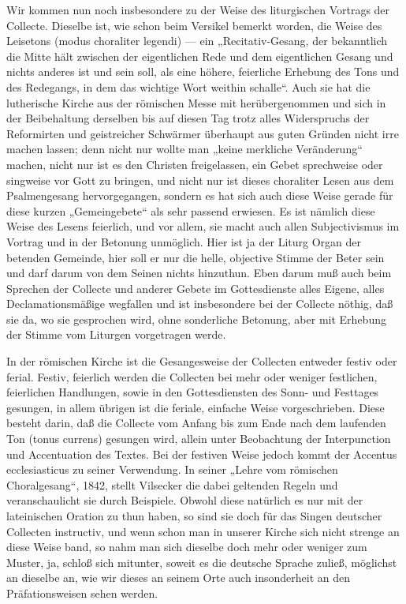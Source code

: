 Wir kommen nun noch insbesondere zu der Weise des liturgischen Vortrags der Collecte. Dieselbe ist, wie schon beim Versikel bemerkt worden, die Weise des Leisetons (modus choraliter legendi) — ein „Recitativ-Gesang, der bekanntlich die Mitte hält zwischen der eigentlichen Rede und dem eigentlichen Gesang und nichts anderes ist und sein soll, als eine höhere, feierliche Erhebung des Tons und des Redegangs, in dem das wichtige Wort weithin schalle“. Auch sie hat die lutherische Kirche aus der römischen Messe mit herübergenommen und sich in der Beibehaltung derselben bis auf diesen Tag trotz alles Widerspruchs der Reformirten und geistreicher Schwärmer überhaupt aus guten Gründen nicht irre machen lassen; denn nicht nur wollte man
„keine merkliche Veränderung“ machen, nicht nur ist es den Christen freigelassen, ein Gebet sprechweise oder singweise vor Gott zu bringen, und nicht nur ist dieses choraliter Lesen aus dem Psalmengesang hervorgegangen, sondern es hat sich auch diese Weise gerade für diese kurzen „Gemeingebete“ als sehr passend erwiesen. Es ist nämlich diese Weise des Lesens feierlich, und vor allem, sie macht auch allen Subjectivismus im Vortrag und in der Betonung unmöglich. Hier ist ja der Liturg Organ der betenden Gemeinde, hier soll er nur die helle, objective Stimme der Beter sein und darf darum von dem Seinen nichts hinzuthun. Eben darum muß auch beim Sprechen der Collecte und anderer Gebete im Gottesdienste alles Eigene, alles Declamationsmäßige wegfallen und ist insbesondere bei der Collecte nöthig, daß sie da, wo sie gesprochen wird, ohne sonderliche Betonung, aber mit Erhebung der Stimme vom Liturgen vorgetragen werde.

In der römischen Kirche ist die Gesangesweise der Collecten entweder festiv oder ferial. Festiv, feierlich werden die Collecten bei mehr oder weniger festlichen, feierlichen Handlungen, sowie in den Gottesdiensten des Sonn- und Festtages gesungen, in allem übrigen ist die feriale, einfache Weise vorgeschrieben. Diese besteht darin, daß die Collecte vom Anfang bis zum Ende nach dem laufenden Ton (tonus currens) gesungen wird, allein unter Beobachtung der Interpunction und Accentuation des Textes. Bei der festiven Weise jedoch kommt der Accentus ecclesiasticus zu seiner Verwendung. In seiner „Lehre vom römischen Choralgesang“, 1842, stellt Vilsecker die dabei geltenden Regeln und veranschaulicht sie durch Beispiele. Obwohl diese natürlich es nur mit der lateinischen Oration zu thun haben, so sind sie doch für das Singen deutscher Collecten instructiv, und wenn schon man in unserer Kirche sich nicht strenge an diese Weise band, so nahm man sich dieselbe doch mehr oder weniger zum Muster, ja, schloß sich mitunter, soweit es die deutsche Sprache zuließ, möglichst an dieselbe an, wie wir dieses an seinem Orte auch insonderheit an den Präfationsweisen sehen werden.

